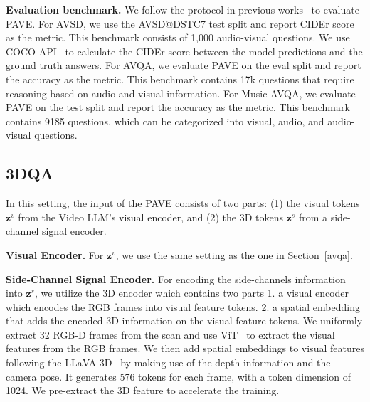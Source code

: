 \medskip
\noindent\textbf{Evaluation benchmark.} We follow the protocol in previous works~\cite{ye2024catenhancingmultimodallarge, pham2022videodialogconversationobjects} to evaluate PAVE. For AVSD, we use the AVSD@DSTC7 test split and report CIDEr score as the metric. This benchmark consists of 1,000 audio-visual questions.
We use COCO API~\cite{lin2015microsoftcococommonobjects} to calculate the CIDEr score between the model predictions and the ground truth answers. 
For AVQA, we evaluate PAVE on the eval split and report the accuracy as the metric. This benchmark contains 17k questions that require reasoning based on audio and visual information.
For Music-AVQA, we evaluate PAVE on the test split and report the accuracy as the metric. This benchmark contains 9185 questions, which can be categorized into visual, audio, and audio-visual questions.







\subsection{3DQA} \label{3dqa}
In this setting, the input of the PAVE consists of two parts: (1) the visual tokens $\mathbf{z}^v$ from the Video LLM's visual encoder, and (2) the 3D tokens $\mathbf{z}^s$ from a side-channel signal encoder.

\medskip
\noindent \textbf{Visual Encoder.} For $\mathbf{z}^v$, we use the same setting as the one in Section~\ref{avqa}. 

\medskip
\noindent \textbf{Side-Channel Signal Encoder.} For encoding the side-channels information into $\mathbf{z}^s$, we utilize the 3D encoder which contains two parts 1. a visual encoder which encodes the RGB frames into visual feature tokens. 2. a spatial embedding that adds the encoded 3D information on the visual feature tokens. We uniformly extract 32 RGB-D frames from the scan and use ViT~\cite{dosovitskiy2021imageworth16x16words} to extract the visual features from the RGB frames. We then add spatial embeddings to visual features following the LLaVA-3D~\cite{zhu2024llava3dsimpleeffectivepathway} by making use of the depth information and the camera pose. It generates 576 tokens for each frame, with a token dimension of 1024. We pre-extract the 3D feature to accelerate the training.


